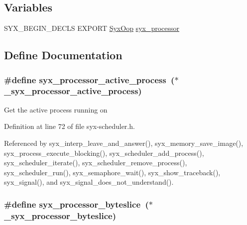 \subsection*{Variables}
\begin{CompactItemize}
\item 
SYX\_\-BEGIN\_\-DECLS EXPORT \hyperlink{syx-types_8h_1121caba2d40b2ce090b640762744ccd}{SyxOop} \hyperlink{syx-scheduler_8h_7a21f5718c04cc99b3c4aaf22bdd6d7b}{syx\_\-processor}
\end{CompactItemize}


\subsection{Define Documentation}
\hypertarget{syx-scheduler_8h_3785c5106dbc4cdcb992b6d17024da72}{
\subsubsection{\setlength{\rightskip}{0pt plus 5cm}\#define syx\_\-processor\_\-active\_\-process~($\ast$\_\-syx\_\-processor\_\-active\_\-process)}}
\label{syx-scheduler_8h_3785c5106dbc4cdcb992b6d17024da72}


Get the active process running on 

Definition at line 72 of file syx-scheduler.h.

Referenced by syx\_\-interp\_\-leave\_\-and\_\-answer(), syx\_\-memory\_\-save\_\-image(), syx\_\-process\_\-execute\_\-blocking(), syx\_\-scheduler\_\-add\_\-process(), syx\_\-scheduler\_\-iterate(), syx\_\-scheduler\_\-remove\_\-process(), syx\_\-scheduler\_\-run(), syx\_\-semaphore\_\-wait(), syx\_\-show\_\-traceback(), syx\_\-signal(), and syx\_\-signal\_\-does\_\-not\_\-understand().\hypertarget{syx-scheduler_8h_a45ab87994042ea76587b30a1599aee1}{
\subsubsection{\setlength{\rightskip}{0pt plus 5cm}\#define syx\_\-processor\_\-byteslice~($\ast$\_\-syx\_\-processor\_\-byteslice)}}
\label{syx-scheduler_8h_a45ab87994042ea76587b30a1599aee1}


